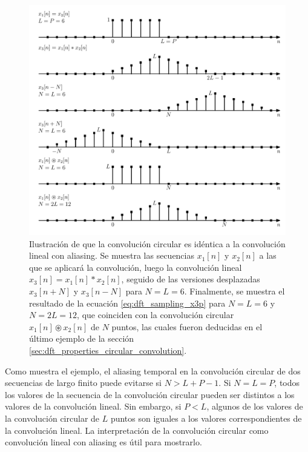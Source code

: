 \documentclass[a4paper]{report}
\begin{document}
\begin{figure}[!htb]
 \begin{center}
 \includegraphics[width=1\textwidth]{figuras/dft_circular_convolution_as_linear_with_aliasing_example_1.pdf}
 \caption{\label{fig:dft_circular_convolution_as_linear_with_aliasing_example_1} Ilustración de que la convolución circular es idéntica a la convolución lineal con aliasing. Se muestra las secuencias \(x_1[n]\) y \(x_2[n]\) a las que se aplicará la convolución, luego la convolución lineal \(x_3[n]=x_1[n]*x_2[n]\), seguido de las versiones desplazadas \(x_3[n+N]\) y \(x_3[n-N]\) para \(N=L=6\). Finalmente, se muestra el resultado de la ecuación \ref{eq:dft_sampling_x3p} para \(N=L=6\) y \(N=2L=12\), que coinciden con la convolución circular \(x_1[n]\circledast x_2[n]\) de \(N\) puntos, las cuales fueron deducidas en el último ejemplo de la sección \ref{sec:dft_properties_circular_convolution}.}
 \end{center}
\end{figure}

Como muestra el ejemplo, el aliasing temporal en la convolución circular de dos secuencias de largo finito puede evitarse si \(N>L+P-1\). Si \(N=L=P\), todos los valores de la secuencia de la convolución circular pueden ser distintos a los valores de la convolución lineal. Sin embargo, si \(P<L\), algunos de los valores de la convolución circular de \(L\) puntos son iguales a los valores correspondientes de la convolución lineal. La interpretación de la convolución circular como convolución lineal con aliasing es útil para mostrarlo.
\end{document}
